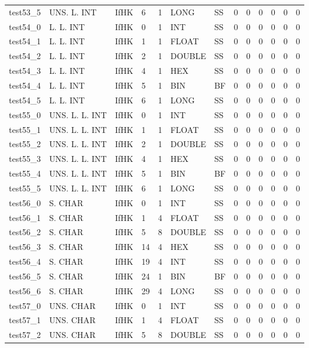 \begin{longtable}{|l|l|l|p{0.5cm}|p{0.5cm}|l|p{0.5cm}|p{0.5cm}|p{0.5cm}|l|l|p{0.5cm}|l|}
test53\_5 & UNS. L. INT & IfHK & 6 & 1 & LONG & SS & 0 & 0 & 0 & 0 & 0 & 0 \\
test54\_0 & L. L. INT & IfHK & 0 & 1 & INT & SS & 0 & 0 & 0 & 0 & 0 & 0 \\
test54\_1 & L. L. INT & IfHK & 1 & 1 & FLOAT & SS & 0 & 0 & 0 & 0 & 0 & 0 \\
test54\_2 & L. L. INT & IfHK & 2 & 1 & DOUBLE & SS & 0 & 0 & 0 & 0 & 0 & 0 \\
test54\_3 & L. L. INT & IfHK & 4 & 1 & HEX & SS & 0 & 0 & 0 & 0 & 0 & 0 \\
test54\_4 & L. L. INT & IfHK & 5 & 1 & BIN & BF & 0 & 0 & 0 & 0 & 0 & 0 \\
test54\_5 & L. L. INT & IfHK & 6 & 1 & LONG & SS & 0 & 0 & 0 & 0 & 0 & 0 \\
test55\_0 & UNS. L. L. INT & IfHK & 0 & 1 & INT & SS & 0 & 0 & 0 & 0 & 0 & 0 \\
test55\_1 & UNS. L. L. INT & IfHK & 1 & 1 & FLOAT & SS & 0 & 0 & 0 & 0 & 0 & 0 \\
test55\_2 & UNS. L. L. INT & IfHK & 2 & 1 & DOUBLE & SS & 0 & 0 & 0 & 0 & 0 & 0 \\
test55\_3 & UNS. L. L. INT & IfHK & 4 & 1 & HEX & SS & 0 & 0 & 0 & 0 & 0 & 0 \\
test55\_4 & UNS. L. L. INT & IfHK & 5 & 1 & BIN & BF & 0 & 0 & 0 & 0 & 0 & 0 \\
test55\_5 & UNS. L. L. INT & IfHK & 6 & 1 & LONG & SS & 0 & 0 & 0 & 0 & 0 & 0 \\
test56\_0 & S. CHAR & IfHK & 0 & 1 & INT & SS & 0 & 0 & 0 & 0 & 0 & 0 \\
test56\_1 & S. CHAR & IfHK & 1 & 4 & FLOAT & SS & 0 & 0 & 0 & 0 & 0 & 0 \\
test56\_2 & S. CHAR & IfHK & 5 & 8 & DOUBLE & SS & 0 & 0 & 0 & 0 & 0 & 0 \\
test56\_3 & S. CHAR & IfHK & 14 & 4 & HEX & SS & 0 & 0 & 0 & 0 & 0 & 0 \\
test56\_4 & S. CHAR & IfHK & 19 & 4 & INT & SS & 0 & 0 & 0 & 0 & 0 & 0 \\
test56\_5 & S. CHAR & IfHK & 24 & 1 & BIN & BF & 0 & 0 & 0 & 0 & 0 & 0 \\
test56\_6 & S. CHAR & IfHK & 29 & 4 & LONG & SS & 0 & 0 & 0 & 0 & 0 & 0 \\
test57\_0 & UNS. CHAR & IfHK & 0 & 1 & INT & SS & 0 & 0 & 0 & 0 & 0 & 0 \\
test57\_1 & UNS. CHAR & IfHK & 1 & 4 & FLOAT & SS & 0 & 0 & 0 & 0 & 0 & 0 \\
test57\_2 & UNS. CHAR & IfHK & 5 & 8 & DOUBLE & SS & 0 & 0 & 0 & 0 & 0 & 0 \\

\end{longtable}
